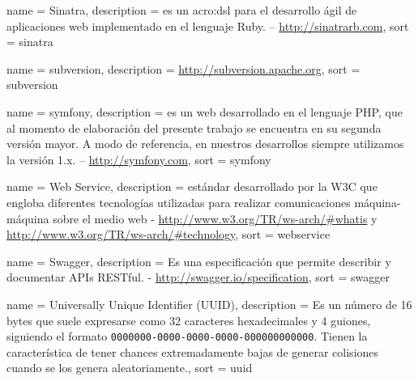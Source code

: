  {
  name = {Sinatra},
  description = {es un \gls{acro:dsl} para el desarrollo ágil de aplicaciones web implementado en el lenguaje Ruby. – \url{http://sinatrarb.com}},
  sort = {sinatra}
}

 {
  name = {subversion},
  description = {\url{http://subversion.apache.org}},
  sort = {subversion}
}

 {
  name = {symfony},
  description = {es un  web desarrollado en el lenguaje PHP, que al momento de elaboración del presente trabajo se encuentra en su segunda versión mayor. A modo de referencia, en nuestros desarrollos siempre utilizamos la versión 1.x. – \url{http://symfony.com}},
  sort = {symfony}
}

 {
  name = {Web Service},
  description = {estándar desarrollado por la W3C que engloba diferentes tecnologías utilizadas para realizar comunicaciones máquina-máquina sobre el medio web - \url{http://www.w3.org/TR/ws-arch/\#whatis} y \url{http://www.w3.org/TR/ws-arch/\#technology}},
  sort = {webservice}
}

 {
  name = {Swagger},
  description = {Es una especificación que permite describir y documentar APIs RESTful. - \url{http://swagger.io/specification}},
  sort = {swagger}
}

 {
  name = {Universally Unique Identifier (UUID)},
  description = {Es un número de 16 bytes que suele expresarse como 32 caracteres hexadecimales y 4 guiones, siguiendo el formato \texttt{0000000-0000-0000-0000-000000000000}. Tienen la característica de tener chances extremadamente bajas de generar colisiones cuando se los genera aleatoriamente.},
  sort = {uuid}
}

